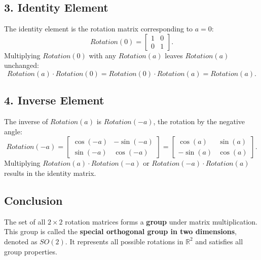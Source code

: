 \documentclass{article}
\begin{document}
\subsection*{3. Identity Element}
The identity element is the rotation matrix corresponding to \(a = 0\):
\begin{equation}
Rotation(0) = \begin{bmatrix}
1 & 0 \\
0 & 1
\end{bmatrix}.
\end{equation}
Multiplying \( Rotation(0) \) with any \( Rotation(a) \) leaves \( Rotation(a) \) unchanged:
\begin{equation}
Rotation(a) \cdot Rotation(0) = Rotation(0) \cdot Rotation(a) = Rotation(a).
\end{equation}

\subsection*{4. Inverse Element}
The inverse of \( Rotation(a) \) is \( Rotation(-a) \), the rotation by the negative angle:
\begin{equation}
Rotation(-a) = \begin{bmatrix}
\cos(-a) & -\sin(-a) \\
\sin(-a) & \cos(-a)
\end{bmatrix} = \begin{bmatrix}
\cos(a) & \sin(a) \\
-\sin(a) & \cos(a)
\end{bmatrix}.
\end{equation}
Multiplying \( Rotation(a) \cdot Rotation(-a) \) or \( Rotation(-a) \cdot Rotation(a) \) results in the identity matrix.

\subsection*{Conclusion}
The set of all \( 2 \times 2 \) rotation matrices forms a \textbf{group} under matrix multiplication. This group is called the \textbf{special orthogonal group in two dimensions}, denoted as \( SO(2) \). It represents all possible rotations in \( \mathbb{R}^2 \) and satisfies all group properties.
\end{document}
